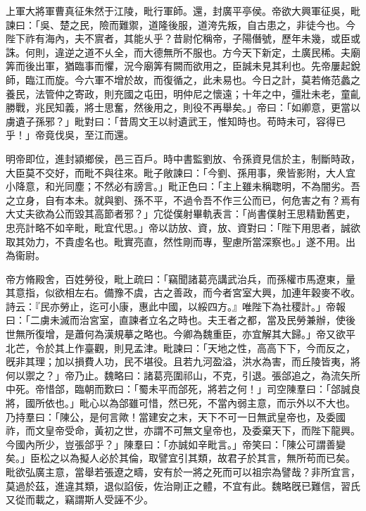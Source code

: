 \begin{pinyinscope}
上軍大將軍曹真征朱然于江陵，毗行軍師。還，封廣平亭侯。帝欲大興軍征吳，毗諫曰：「吳、楚之民，險而難禦，道隆後服，道洿先叛，自古患之，非徒今也。今陛下祚有海內，夫不賔者，其能乆乎？昔尉佗稱帝，子陽僭號，歷年未幾，或臣或誅。何則，違逆之道不乆全，而大德無所不服也。方今天下新定，土廣民稀。夫廟筭而後出軍，猶臨事而懼，況今廟筭有闕而欲用之，臣誠未見其利也。先帝屢起銳師，臨江而旋。今六軍不增於故，而復循之，此未易也。今日之計，莫若脩范蠡之養民，法管仲之寄政，則充國之屯田，明仲尼之懷遠；十年之中，彊壯未老，童齓勝戰，兆民知義，將士思奮，然後用之，則役不再舉矣。」帝曰：「如卿意，更當以虜遺子孫邪？」毗對曰：「昔周文王以紂遺武王，惟知時也。苟時未可，容得已乎！」帝竟伐吳，至江而還。

明帝即位，進封潁鄉侯，邑三百戶。時中書監劉放、令孫資見信於主，制斷時政，大臣莫不交好，而毗不與往來。毗子敞諫曰：「今劉、孫用事，衆皆影附，大人宜小降意，和光同塵；不然必有謗言。」毗正色曰：「主上雖未稱聦明，不為闇劣。吾之立身，自有本未。就與劉、孫不平，不過令吾不作三公而已，何危害之有？焉有大丈夫欲為公而毀其高節者邪？」宂從僕射畢軌表言：「尚書僕射王思精勤舊吏，忠亮計略不如辛毗，毗宜代思。」帝以訪放、資，放、資對曰：「陛下用思者，誠欲取其効力，不貴虛名也。毗實亮直，然性剛而專，聖慮所當深察也。」遂不用。出為衞尉。

帝方脩殿舍，百姓勞役，毗上疏曰：「竊聞諸葛亮講武治兵，而孫權巿馬遼東，量其意指，似欲相左右。備豫不虞，古之善政，而今者宮室大興，加連年穀麥不收。詩云：『民亦勞止，迄可小康，惠此中國，以綏四方。』唯陛下為社稷計。」帝報曰：「二虜未滅而治宮室，直諫者立名之時也。夫王者之都，當及民勞兼辦，使後世無所復增，是蕭何為漢規摹之略也。今卿為魏重臣，亦宜解其大歸。」帝又欲平北芒，令於其上作臺觀，則見孟津。毗諫曰：「天地之性，高高下下，今而反之，旣非其理；加以損費人功，民不堪役。且若九河盈溢，洪水為害，而丘陵皆夷，將何以禦之？」帝乃止。魏略曰：諸葛亮圍祁山，不克，引退。張郃追之，為流矢所中死。帝惜郃，臨朝而歎曰：「蜀未平而郃死，將若之何！」司空陳羣曰：「郃誠良將，國所依也。」毗心以為郃雖可惜，然已死，不當內弱主意，而示外以不大也。乃持羣曰：「陳公，是何言歟！當建安之末，天下不可一日無武皇帝也，及委國祚，而文皇帝受命，黃初之世，亦謂不可無文皇帝也，及委棄天下，而陛下龍興。今國內所少，豈張郃乎？」陳羣曰：「亦誠如辛毗言。」帝笑曰：「陳公可謂善變矣。」臣松之以為擬人必於其倫，取譬宜引其類，故君子於其言，無所苟而已矣。毗欲弘廣主意，當舉若張遼之疇，安有於一將之死而可以祖宗為譬哉？非所宜言，莫過於茲，進違其類，退似諂佞，佐治剛正之體，不宜有此。魏略旣已難信，習氏又從而載之，竊謂斯人受誣不少。


\end{pinyinscope}
